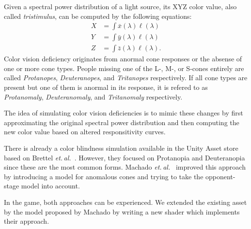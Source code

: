 \documentclass{acm_proc_article-sp}
\newcommand{\etal}{\textit{et. al.}}
\begin{document}
Given a spectral power distribution of a light source, its XYZ color value, also called \emph{tristimulus}, can be computed by the following equations:
\begin{eqnarray}
    X &= \int\bar x(\lambda) \ell(\lambda) \\
    Y &= \int\bar y(\lambda) \ell(\lambda) \\
    Z &= \int\bar z(\lambda) \ell(\lambda).
\end{eqnarray}
%
Color vision deficiency originates from anormal cone responses or the absense of one or more cone types.
People missing one of the L-, M-, or S-cones entirely are called \emph{Protanopes}, \emph{Deuteranopes}, and \emph{Tritanopes} respectively.
If all cone types are present but one of them is anormal in its response, it is refered to as \emph{Protanomaly}, \emph{Deuteranomaly}, and \emph{Tritanomaly} respectively.

The idea of simulating color vision deficiencies is to mimic these changes by first approximating the original spectral power distribution and then computing the new color value based on altered responsitivity curves.

There is already a color blindness simulation available in the Unity Asset store based on Brettel \etal~\cite{brettel}.
However, they focused on Protanopia and Deuteranopia since these are the most common forms.
Machado \etal~\cite{Machado2009} improved this approach by introducing a model for anomalous cones and trying to take the opponent-stage model into account.

In the game, both approaches can be experienced.
We extended the existing asset by the model proposed by Machado by writing a new shader which implements their approach.

\end{document}
